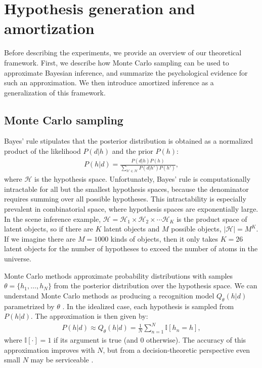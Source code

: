 \section{Hypothesis generation and amortization}

Before describing the experiments, we provide an overview of our theoretical framework. First, we describe how Monte Carlo sampling can be used to approximate Bayesian inference, and summarize the psychological evidence for such an approximation. We then introduce amortized inference as a generalization of this framework.

\subsection{Monte Carlo sampling}
Bayes' rule stipulates that the posterior distribution is obtained as a normalized product of the likelihood $P(d|h)$ and the prior $P(h)$:
\begin{align}
P(h|d) = \frac{P(d|h)P(h)}{\sum_{h' \in \mathcal{H}} P(d|h') P(h')},
\end{align}
where $\mathcal{H}$ is the hypothesis space. Unfortunately, Bayes' rule is computationally intractable for all but the smallest hypothesis spaces, because the denominator requires summing over all possible hypotheses. This intractability is especially prevalent in combinatorial space, where hypothesis spaces are exponentially large. In the scene inference example, $\mathcal{H} = \mathcal{H}_1 \times \mathcal{H}_2 \times \cdots \mathcal{H}_K$ is the product space of latent objects, so if there are $K$ latent objects and $M$ possible objects, $|\mathcal{H}| = M^K$. If we imagine there are $M=1000$ kinds of objects, then it only takes $K=26$ latent objects for the number of hypotheses to exceed the number of atoms in the universe.

Monte Carlo methods approximate probability distributions with samples $\theta = \{h_1,\ldots,h_N \}$ from the posterior distribution over the hypothesis space. We can understand Monte Carlo methods as producing a recognition model $Q_\theta(h|d)$ parametrized by $\theta$ \citep[see][for a systematic treatment]{saeedi17}. In the idealized case, each hypothesis is sampled from $P(h|d)$. The approximation is then given by:
\begin{align}
\textstyle
P(h|d) \approx Q_\theta(h|d) = \frac{1}{N}\sum_{n=1}^N \mathbb{I}[h_n=h],
\end{align}
where $\mathbb{I}[\cdot] = 1$ if its argument is true (and 0 otherwise). The accuracy of this approximation improves with $N$, but from a decision-theoretic perspective even small $N$ may be serviceable \citep{vul2014one,lieder2017anchoring,gershman2015computational}.

